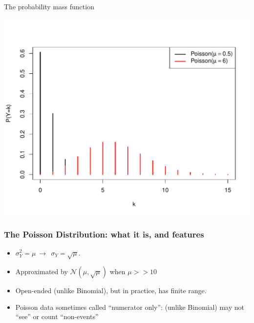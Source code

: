 \documentclass[10pt]{beamer}\usepackage[]{graphicx}\usepackage[]{color}
\makeatletter
\def\maxwidth{ %
  \ifdim\Gin@nat@width>\linewidth
    \linewidth
  \else
    \Gin@nat@width
  \fi
}
\newenvironment{knitrout}{}{} %
\makeatother
\begin{document}
\begin{frame}[fragile]{The probability mass function}
	
\begin{knitrout}\tiny
{}\color{fgcolor}

{\centering \includegraphics[width=\maxwidth]{figure/unnamed-chunk-11-1} 

}



\end{knitrout}
	
\end{frame}


\begin{frame}
	\frametitle{The Poisson Distribution: what it is, and features}
	
	\begin{itemize}
		\setlength\itemsep{2em}
		\item  $\sigma^2_Y =  \mu \ \to \ \ \sigma_Y =  \sqrt{\mu}.$ \pause
		\item  Approximated by $\mathcal{N}(\mu, \sqrt{\mu})$ when $\mu >> 10$ \pause 
		\item Open-ended (unlike Binomial), but in practice, has finite range. 
		
		\item Poisson data sometimes called ``numerator only'':  (unlike Binomial) may not ``see'' or  count ``non-events''
	\end{itemize}
\end{frame}
\end{document}
